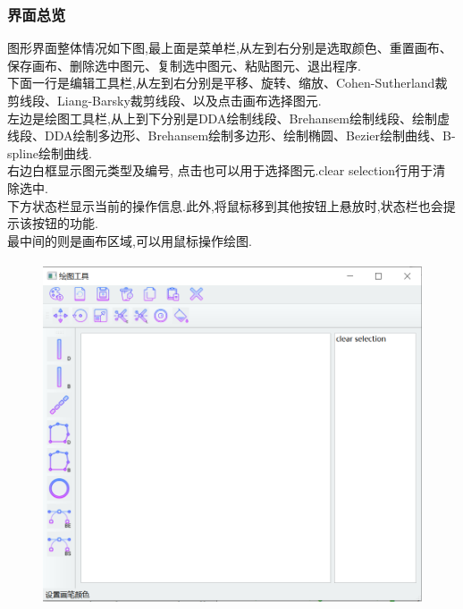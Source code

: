 \documentclass[a4paper,UTF8]{article}
\theoremstyle{definition}
\begin{document}
\subsubsection{界面总览}
图形界面整体情况如下图,最上面是菜单栏,从左到右分别是选取颜色、重置画布、保存画布、删除选中图元、复制选中图元、粘贴图元、退出程序.\\
\indent 下面一行是编辑工具栏,从左到右分别是平移、旋转、缩放、Cohen-Sutherland裁剪线段、Liang-Barsky裁剪线段、以及点击画布选择图元.\\
\indent 左边是绘图工具栏,从上到下分别是DDA绘制线段、Brehansem绘制线段、绘制虚线段、DDA绘制多边形、Brehansem绘制多边形、绘制椭圆、Bezier绘制曲线、B-spline绘制曲线.\\
\indent 右边白框显示图元类型及编号, 点击也可以用于选择图元.clear selection行用于清除选中.\\
\indent 下方状态栏显示当前的操作信息.此外,将鼠标移到其他按钮上悬放时,状态栏也会提示该按钮的功能.\\
\indent 最中间的则是画布区域,可以用鼠标操作绘图.
\begin{figure}[H]
	\includegraphics[width=5in,height=4in]{total.png}
\end{figure}
\end{document}
